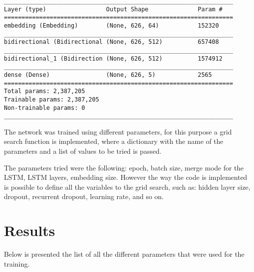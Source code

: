 \documentclass{article}
\begin{document}
\begin{verbatim}
_________________________________________________________________
Layer (type)                 Output Shape              Param #   
=================================================================
embedding (Embedding)        (None, 626, 64)           152320    
_________________________________________________________________
bidirectional (Bidirectional (None, 626, 512)          657408    
_________________________________________________________________
bidirectional_1 (Bidirection (None, 626, 512)          1574912   
_________________________________________________________________
dense (Dense)                (None, 626, 5)            2565      
=================================================================
Total params: 2,387,205
Trainable params: 2,387,205
Non-trainable params: 0
_________________________________________________________________
\end{verbatim}

The network was trained using different parameters, for this purpose a grid search function is implemented, where a dictionary with the name of the parameters and a list of values to be tried is passed.

The parameters tried were the following: epoch, batch size, merge mode for the LSTM, LSTM layers, embedding size. However the way the code is implemented is possible to define all the variables to the grid search, such as: hidden layer size, dropout, recurrent dropout, learning rate, and so on.



\section{Results}

Below is presented the list of all the different parameters that were used for the training.
\end{document}
